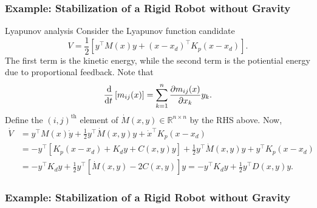 \begin{frame}
    \frametitle{Example: Stabilization of a Rigid Robot without Gravity}

    \begin{block}{Lyapunov analysis}
        Consider the Lyapunov function candidate \[ V = \frac{1}{2} \left[y^\top
        M(x) y + (x-x_d)^\top K_p (x-x_d) \right]. \] The first term is the
        kinetic energy, while the second term is the potiential energy due to
        proportional feedback. Note that
        \[ \frac{\operatorname{d}\!}{\operatorname{d}\! t}\left[ m_{ij}(x) \right] = \sum_{k=1}^n
        \frac{\partial m_{ij}(x)}{\partial x_k}y_k. \] Define the $(i,j)^{\text{th}}$ element
        of $\dot{M}(x,y) \in \mathbb{R}^{n \times n}$ by the RHS above. Now, 
        \begin{align*}
            \dot{V} &= y^\top M(x) \dot{y} + \frac{1}{2}y^\top\dot{M}(x,y)y + \dot{x}^\top K_p (x - x_d) \\
            &= -y^\top \left[ K_p(x-x_d) + K_dy + C(x,y)y \right] + \frac{1}{2}y^\top \dot{M}(x,y)y + y^\top K_p (x-x_d) \\
            &= -y^\top K_d y + \frac{1}{2}y^\top \left[ \dot{M}(x,y) - 2C(x,y) \right]y = -y^\top K_d y + \frac{1}{2} y^\top D(x,y) y.
        \end{align*}
    \end{block}
\end{frame}

\begin{frame}
    \frametitle{Example: Stabilization of a Rigid Robot without Gravity}
\end{frame}

